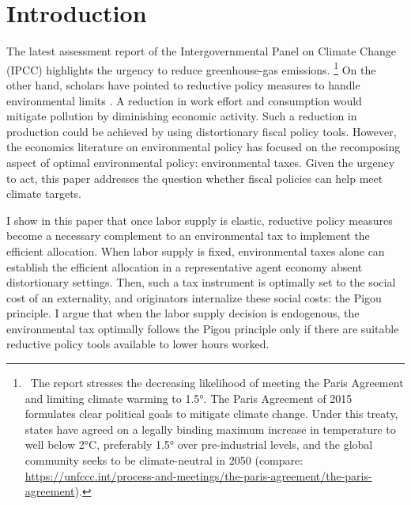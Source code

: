 \section{Introduction}


The latest assessment report of the Intergovernmental Panel on Climate Change (IPCC) \citep{IPCC2022} highlights the urgency to reduce greenhouse-gas emissions.%
\footnote{ \  The report stresses the decreasing likelihood of meeting the Paris Agreement and limiting climate warming to 1.5°. The Paris Agreement of 2015 formulates clear political goals to mitigate climate change. Under this treaty, states have agreed on a legally binding maximum increase in temperature to well below 2°C, preferably 1.5° over pre-industrial levels, and the global community seeks to be climate-neutral in 2050  (compare:\\ \url{https://unfccc.int/process-and-meetings/the-paris-agreement/the-paris-agreement}). 
}
On the other hand, scholars have pointed to reductive policy measures to handle environmental limits \citep{Arrow2004AreMuch, Schor2005SustainableReduction, Dasgupta2021}. A reduction in work effort and consumption would mitigate pollution by diminishing economic activity. Such a reduction in production could be achieved by using distortionary fiscal policy tools.
However, the economics literature on environmental policy has focused on the recomposing aspect of optimal environmental policy: environmental taxes. %
Given the urgency to act, this paper addresses the question whether fiscal policies can help meet climate targets.

I show in this paper that  once 
labor supply is elastic, reductive policy measures become a necessary complement to an environmental tax to implement the efficient allocation. 
When labor supply is fixed, environmental taxes alone can establish the efficient allocation in a representative agent economy absent distortionary settings. Then, such a tax instrument is optimally set to the social cost of an externality, and originators internalize these social costs: the Pigou principle. I argue that when the labor supply decision is endogenous, the environmental tax optimally follows the Pigou principle only if there are suitable reductive policy tools available to lower hours worked.

